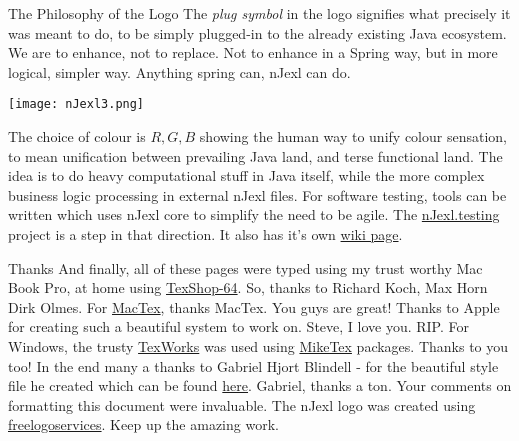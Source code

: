\begin{subsection}{The Philosophy of the Logo}
The \emph{plug symbol} in the logo signifies what precisely it was meant to do, 
to be simply plugged-in to the already existing Java ecosystem.  
We are to enhance, not to replace. Not to enhance in a Spring way, but in more logical, 
simpler way. Anything spring can, nJexl can do.

\begin{minipage}{0.8\textwidth}
    \centering
    \texttt{[image: nJexl3.png]}
\end{minipage}

The choice of colour is $R,G,B$ showing the human way to unify colour sensation, to mean unification between 
prevailing Java land, and terse functional land.
The idea is to do heavy computational stuff in Java itself, while the more complex business logic processing
in external nJexl files. For software testing, tools can be written which uses nJexl core to simplify 
the need to be agile. The \href{https://github.com/nmondal/njexl/tree/master/testing}{nJexl.testing} project is a step in that direction.
It also has it's own \href{https://github.com/nmondal/njexl/wiki/12-Using-Test-Framework}{wiki page}.

\end{subsection}


\begin{subsection}{Thanks}
And finally, all of these pages were typed using my trust worthy Mac Book Pro, at home using \href{http://pages.uoregon.edu/koch/texshop}{TexShop-64}.
So, thanks to Richard Koch, Max Horn Dirk Olmes. For \href{http://tug.org/mactex/}{MacTex}, thanks MacTex. You guys are great!
Thanks to Apple for creating such a beautiful system to work on. Steve, I love you. RIP.
For Windows, the trusty \href{http://www.tug.org/texworks}{TexWorks} was used using \href{http://miktex.org}{MikeTex} packages. Thanks to you too!
In the end many a thanks to Gabriel Hjort Blindell - for the beautiful style file he created which can be found 
\href{http://gabriel.hjort.blindell.se/publications/documents/thesis-template.tar.gz}{here}. Gabriel, thanks a ton.
Your comments on formatting this document were invaluable.
The nJexl logo was created using \href{http://www.freelogoservices.com/}{freelogoservices}. 
Keep up the amazing work.

\end{subsection}